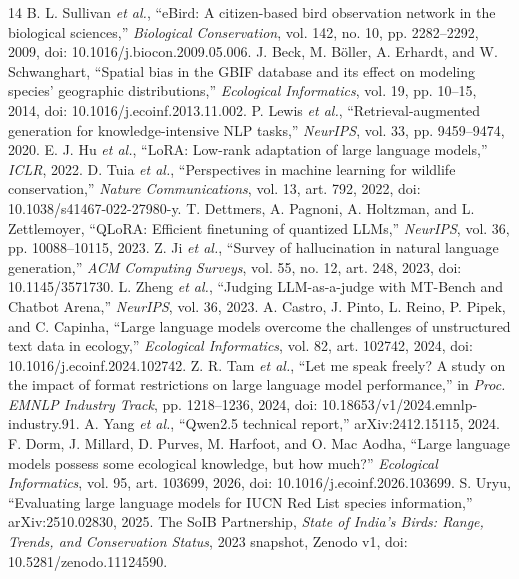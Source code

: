 \documentclass[a4paper,conference,10pt]{IEEEtran}
\begin{document}
\begin{thebibliography}{14}\footnotesize
{} B. L. Sullivan \emph{et al.}, ``eBird: A citizen-based bird observation network in the biological sciences,'' \emph{Biological Conservation}, vol. 142, no. 10, pp. 2282--2292, 2009, doi: 10.1016/j.biocon.2009.05.006.
 J. Beck, M. B\"oller, A. Erhardt, and W. Schwanghart, ``Spatial bias in the GBIF database and its effect on modeling species' geographic distributions,'' \emph{Ecological Informatics}, vol. 19, pp. 10--15, 2014, doi: 10.1016/j.ecoinf.2013.11.002.
 P. Lewis \emph{et al.}, ``Retrieval-augmented generation for knowledge-intensive NLP tasks,'' \emph{NeurIPS}, vol. 33, pp. 9459--9474, 2020.
 E. J. Hu \emph{et al.}, ``LoRA: Low-rank adaptation of large language models,'' \emph{ICLR}, 2022.
 D. Tuia \emph{et al.}, ``Perspectives in machine learning for wildlife conservation,'' \emph{Nature Communications}, vol. 13, art. 792, 2022, doi: 10.1038/s41467-022-27980-y.
 T. Dettmers, A. Pagnoni, A. Holtzman, and L. Zettlemoyer, ``QLoRA: Efficient finetuning of quantized LLMs,'' \emph{NeurIPS}, vol. 36, pp. 10088--10115, 2023.
 Z. Ji \emph{et al.}, ``Survey of hallucination in natural language generation,'' \emph{ACM Computing Surveys}, vol. 55, no. 12, art. 248, 2023, doi: 10.1145/3571730.
 L. Zheng \emph{et al.}, ``Judging LLM-as-a-judge with MT-Bench and Chatbot Arena,'' \emph{NeurIPS}, vol. 36, 2023.
 A. Castro, J. Pinto, L. Reino, P. Pipek, and C. Capinha, ``Large language models overcome the challenges of unstructured text data in ecology,'' \emph{Ecological Informatics}, vol. 82, art. 102742, 2024, doi: 10.1016/j.ecoinf.2024.102742.
 Z. R. Tam \emph{et al.}, ``Let me speak freely? A study on the impact of format restrictions on large language model performance,'' in \emph{Proc. EMNLP Industry Track}, pp. 1218--1236, 2024, doi: 10.18653/v1/2024.emnlp-industry.91.
 A. Yang \emph{et al.}, ``Qwen2.5 technical report,'' arXiv:2412.15115, 2024.
 F. Dorm, J. Millard, D. Purves, M. Harfoot, and O. Mac Aodha, ``Large language models possess some ecological knowledge, but how much?'' \emph{Ecological Informatics}, vol. 95, art. 103699, 2026, doi: 10.1016/j.ecoinf.2026.103699.
 S. Uryu, ``Evaluating large language models for IUCN Red List species information,'' arXiv:2510.02830, 2025.
 The SoIB Partnership, \emph{State of India's Birds: Range, Trends, and Conservation Status}, 2023 snapshot, Zenodo v1, doi: 10.5281/zenodo.11124590.
\end{thebibliography}
\end{document}
